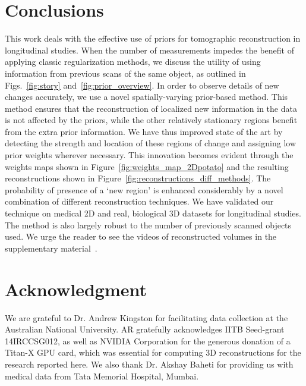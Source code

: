 \documentclass[journal]{IEEEtran}
\begin{document}
\section{Conclusions}
\label{sec:conclusions}
This work deals with the effective use of priors for tomographic
reconstruction in longitudinal studies. When the number of measurements 
impedes the benefit of applying classic regularization methods, we discuss the utility of
using information from previous scans of the same object, as outlined in
Figs.~\ref{fig:story} and~\ref{fig:prior_overview}. In order to observe details of new changes
accurately, we use a novel
spatially-varying prior-based method. This method ensures that the
reconstruction of localized new information in the data is not
affected by the priors, while the other relatively stationary regions benefit from the extra prior information. %
We have thus
improved state of the art by detecting the strength and location
of these regions of change and
assigning low prior weights wherever necessary. This innovation becomes evident through the weights maps shown in Figure~\ref{fig:weights_map_2Dpotato} and the resulting reconstructions shown in Figure~\ref{fig:reconstructions_diff_methods}. The probability of
presence of a `new region' is enhanced considerably by a novel
combination of different reconstruction techniques.  We have validated
our technique on medical 2D and real, biological 3D datasets for
longitudinal studies. The method is also largely robust to the number
of previously scanned objects used. We urge the reader to see the
videos of reconstructed volumes in the supplementary
material~\cite{supp_paper}.

\section{Acknowledgment}
We are grateful to Dr. Andrew Kingston for facilitating data
collection at the Australian National University. AR gratefully
acknowledges IITB Seed-grant 14IRCCSG012, as well as NVIDIA
Corporation for the generous donation of a Titan-X GPU card, which was
essential for computing 3D reconstructions for the research reported
here. We also thank Dr. Akshay Baheti for providing us with medical
data from Tata Memorial Hospital, Mumbai.
{%
}
\end{document}
